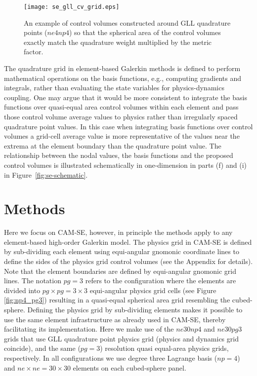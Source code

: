 \documentclass{ametsoc}
\begin{document}
\begin{figure}[t]
\begin{center}
\noindent\texttt{[image: se\_gll\_cv\_grid.eps]}\\
\end{center}
\caption{An example of control volumes constructed around GLL quadrature points ($ne4np4$) so that the spherical area of the control volumes exactly match the quadrature weight multiplied by the metric factor.}
\label{fig:cv-grids}
\end{figure}


The quadrature grid in element-based Galerkin methods is defined to perform mathematical operations on the basis functions, e.g., computing gradients and integrals, rather than evaluating the state variables for physics-dynamics coupling. One may argue that it would be more consistent to integrate the basis functions over quasi-equal area control volumes within each element and pass those control volume average values to physics rather than irregularly spaced quadrature point values. In this case when integrating basis functions over control volumes a grid-cell average value is more representative of the values near the extrema at the element boundary than the quadrature point value. The relationship between the nodal values, the basis functions and the proposed control volumes is illustrated schematically in one-dimension in parts (f) and (i) in Figure~\ref{fig:se-schematic}. 

\section{Methods}\label{sec:methods}
Here we focus on CAM-SE, however, in principle the methods apply to any element-based high-order Galerkin model. The physics grid in CAM-SE is defined by sub-dividing each element using equi-angular gnomonic coordinate lines to define the sides of the physics grid control volumes (see the Appendix for details). Note that the element boundaries are defined by equi-angular gnomonic grid lines. The notation $pg=3$ refers to the configuration where the elements are divided into $pg\times pg=3\times 3$ equi-angular physics grid cells (see Figure \ref{fig:np4_pg3}) resulting in a quasi-equal spherical area grid resembling the cubed-sphere. Defining the physics grid by sub-dividing elements makes it possible to use the same element infrastructure as already used in CAM-SE, thereby facilitating its implementation. Here we make use of the $ne30np4$ and $ne30pg3$ grids that use GLL quadrature point physics grid (physics and dynamics grid coincide), and the same ($pg=3$) resolution quasi equal-area physics grids, respectively. In all configurations we use degree three Lagrange basis ($np=4$) and $ne\times ne=30\times 30$ elements on each cubed-sphere panel.
\end{document}
